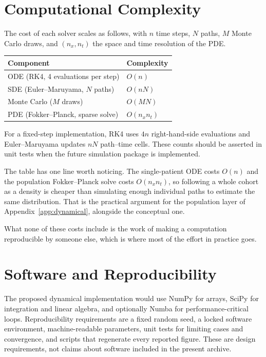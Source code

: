 \section{Computational Complexity}
\label{sec:D_complexity}
The cost of each solver scales as follows, with $n$ time steps, $N$ paths, $M$
Monte Carlo draws, and $(n_x,n_t)$ the space and time resolution of the PDE.
\begin{center}
\begin{tabular}{ll}
\toprule
Component & Complexity \\
\midrule
ODE (RK4, 4 evaluations per step) & $O(n)$ \\
SDE (Euler--Maruyama, $N$ paths)  & $O(nN)$ \\
Monte Carlo ($M$ draws)           & $O(MN)$ \\
PDE (Fokker--Planck, sparse solve)& $O(n_x n_t)$ \\
\bottomrule
\end{tabular}
\end{center}
For a fixed-step implementation, RK4 uses $4n$ right-hand-side evaluations and
Euler--Maruyama updates $nN$ path--time cells. These counts should be asserted in
unit tests when the future simulation package is implemented.

The table has one line worth noticing. The single-patient ODE costs $O(n)$ and
the population Fokker--Planck solve costs $O(n_xn_t)$, so following a whole
cohort as a density is cheaper than simulating enough individual paths to
estimate the same distribution. That is the practical argument for the
population layer of Appendix~\ref{app:dynamical}, alongside the conceptual one.

What none of these costs include is the work of making a computation
reproducible by someone else, which is where most of the effort in practice
goes.

\section{Software and Reproducibility}
\label{sec:D_software}
The proposed dynamical implementation would use NumPy for arrays, SciPy for
integration and linear algebra, and optionally Numba for performance-critical
loops. Reproducibility requirements are a fixed random seed, a locked software
environment, machine-readable parameters, unit tests for limiting cases and
convergence, and scripts that regenerate every reported figure. These are design
requirements, not claims about software included in the present archive.


